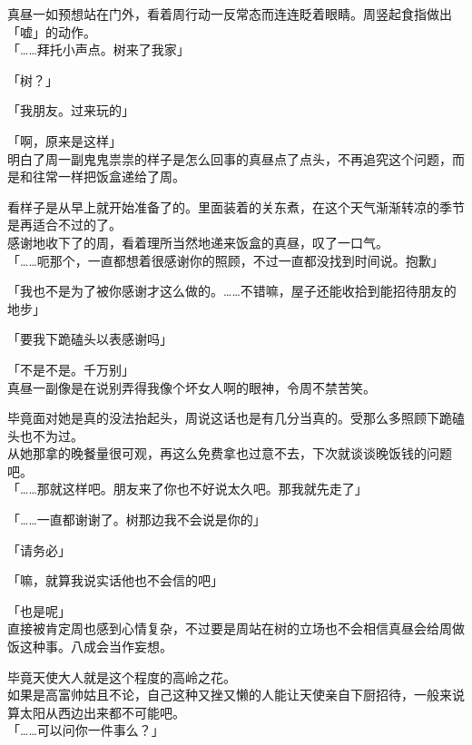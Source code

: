 真昼一如预想站在门外，看着周行动一反常态而连连眨着眼睛。周竖起食指做出「嘘」的动作。\\

「……拜托小声点。树来了我家」

「树？」

「我朋友。过来玩的」

「啊，原来是这样」\\

明白了周一副鬼鬼祟祟的样子是怎么回事的真昼点了点头，不再追究这个问题，而是和往常一样把饭盒递给了周。

看样子是从早上就开始准备了的。里面装着的关东煮，在这个天气渐渐转凉的季节是再适合不过的了。\\

感谢地收下了的周，看着理所当然地递来饭盒的真昼，叹了一口气。\\

「……呃那个，一直都想着很感谢你的照顾，不过一直都没找到时间说。抱歉」

「我也不是为了被你感谢才这么做的。……不错嘛，屋子还能收拾到能招待朋友的地步」

「要我下跪磕头以表感谢吗」

「不是不是。千万别」\\

真昼一副像是在说别弄得我像个坏女人啊的眼神，令周不禁苦笑。

毕竟面对她是真的没法抬起头，周说这话也是有几分当真的。受那么多照顾下跪磕头也不为过。\\

从她那拿的晚餐量很可观，再这么免费拿也过意不去，下次就谈谈晚饭钱的问题吧。\\

「……那就这样吧。朋友来了你也不好说太久吧。那我就先走了」

「……一直都谢谢了。树那边我不会说是你的」

「请务必」

「嘛，就算我说实话他也不会信的吧」

「也是呢」\\

直接被肯定周也感到心情复杂，不过要是周站在树的立场也不会相信真昼会给周做饭这种事。八成会当作妄想。

毕竟天使大人就是这个程度的高岭之花。\\

如果是高富帅姑且不论，自己这种又挫又懒的人能让天使亲自下厨招待，一般来说算太阳从西边出来都不可能吧。\\

「……可以问你一件事么？」

